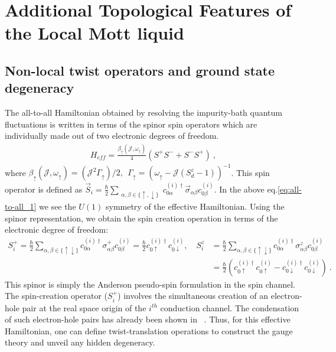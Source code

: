 \documentclass[12pt]{iopart}
\begin{document}
\section{Additional Topological Features of the Local Mott liquid}
\subsection{Non-local twist operators and ground state degeneracy}

The all-to-all Hamiltonian obtained by resolving the impurity-bath quantum fluctuations is written in terms of the spinor spin operators which are individually made out of two electronic degrees of freedom.
\begin{eqnarray}
H_{eff} 
 =\frac{\beta_{\uparrow}({\mathcal{J}},\omega_{\uparrow})}{4} (S^+S^-+S^-S^+)~,
\label{eq:all-to-all_1}
\end{eqnarray}
where \(\beta_{\uparrow} ({\mathcal{J}},\omega_{\uparrow})= ({\mathcal{J}}^2 \Gamma_{\uparrow})/2, ~ ~\Gamma_{\uparrow}=(\omega_{\uparrow}-{\mathcal{J}}(S_d^z-1))^{-1}\). This spin operator is defined as $\vec{S}_i=\frac{\hbar}{2} \displaystyle\sum_{\substack{ \alpha,\beta\in \{\uparrow,\downarrow\}}}  c_{0\alpha}^{(i)\dagger} \vec{\sigma}_{\alpha\beta} c_{0\beta}^{(i)}$. In the above eq.\eqref{eq:all-to-all_1} we see the $U(1)$ symmetry of the effective Hamiltonian. Using the spinor representation, we obtain the spin creation operation in terms of the electronic degree of freedom:
\begin{eqnarray}
S_i^+ = \frac{\hbar}{2} \displaystyle\sum_{\alpha,\beta\in \{\uparrow\downarrow\}} c_{0\alpha}^{(i)\dagger} {\sigma}^{+}_{\alpha\beta} c_{0\beta}^{(i)}
=\frac{\hbar}{2} c_{0\uparrow}^{(i)\dagger} c_{0\downarrow}^{(i)}, \quad S_i^z &= \frac{\hbar}{2} \displaystyle\sum_{\alpha,\beta\in \{\uparrow\downarrow\}} c_{0\alpha}^{(i)\dagger} {\sigma}^{z}_{\alpha\beta} c_{0\beta}^{(i)} \nonumber\\
									       &=\frac{\hbar}{2} (c_{0\uparrow}^{(i)\dagger} c_{0\uparrow}^{(i)} - c_{0\downarrow}^{(i)\dagger} c_{0\downarrow}^{(i)} )~.
\end{eqnarray}
This spinor is simply the Anderson pseudo-spin formulation in the spin channel. The spin-creation operator ($S_i^+$) involves the simultaneous creation of an electron-hole pair at the real space origin of the $i^{th}$ conduction channel. The condensation of such electron-hole pairs has already been shown in ~\cite{anirbanmott1,anirbanmott2}. Thus, for this effective Hamiltonian, one can define twist-translation operations to construct the gauge theory and unveil any hidden degeneracy.
\end{document}
